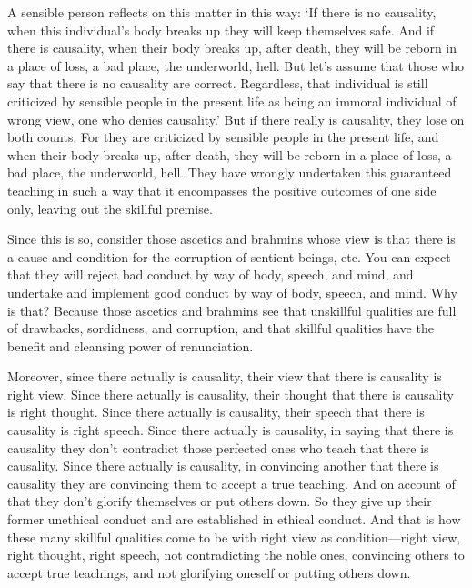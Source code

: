 \documentclass[12pt,openany]{book}%
\begin{document}
A sensible person reflects on this matter in this way: ‘If there is no causality, when this individual’s body breaks up they will keep themselves safe. And if there is causality, when their body breaks up, after death, they will be reborn in a place of loss, a bad place, the underworld, hell. But let’s assume that those who say that there is no causality are correct. Regardless, that individual is still criticized by sensible people in the present life as being an immoral individual of wrong view, one who denies causality.’ But if there really is causality, they lose on both counts. For they are criticized by sensible people in the present life, and when their body breaks up, after death, they will be reborn in a place of loss, a bad place, the underworld, hell. They have wrongly undertaken this guaranteed teaching in such a way that it encompasses the positive outcomes of one side only, leaving out the skillful premise. 

Since this is so, consider those ascetics and brahmins whose view is that there is a cause and condition for the corruption of sentient beings, etc. You can expect that they will reject bad conduct by way of body, speech, and mind, and undertake and implement good conduct by way of body, speech, and mind. Why is that? Because those ascetics and brahmins see that unskillful qualities are full of drawbacks, sordidness, and corruption, and that skillful qualities have the benefit and cleansing power of renunciation. 

Moreover, since there actually is causality, their view that there is causality is right view. Since there actually is causality, their thought that there is causality is right thought. Since there actually is causality, their speech that there is causality is right speech. Since there actually is causality, in saying that there is causality they don’t contradict those perfected ones who teach that there is causality. Since there actually is causality, in convincing another that there is causality they are convincing them to accept a true teaching. And on account of that they don’t glorify themselves or put others down. So they give up their former unethical conduct and are established in ethical conduct. And that is how these many skillful qualities come to be with right view as condition—right view, right thought, right speech, not contradicting the noble ones, convincing others to accept true teachings, and not glorifying oneself or putting others down. 
\end{document}
